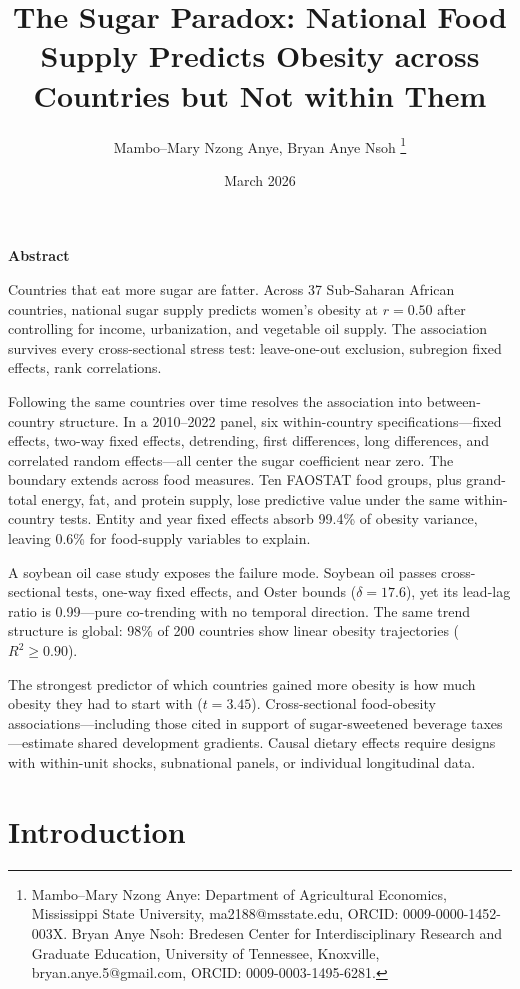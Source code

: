 \documentclass[letterpaper,11pt,leqno]{article}
\title{The Sugar Paradox: National Food Supply Predicts Obesity across Countries but Not within Them}
\author{Mambo–Mary Nzong Anye, Bryan Anye Nsoh
\thanks{Mambo–Mary Nzong Anye: Department of Agricultural Economics, Mississippi State University, ma2188@msstate.edu, ORCID: 0009-0000-1452-003X. Bryan Anye Nsoh: Bredesen Center for Interdisciplinary Research and Graduate Education, University of Tennessee, Knoxville, bryan.anye.5@gmail.com, ORCID: 0009-0003-1495-6281.}}
\date{March 2026}
\begin{document}
\begin{titlepage}
\maketitle

\bigskip
\noindent\textbf{Abstract}
\medskip

\noindent Countries that eat more sugar are fatter.
Across 37 Sub-Saharan African countries, national sugar supply predicts women's obesity at $r = 0.50$ after controlling for income, urbanization, and vegetable oil supply.
The association survives every cross-sectional stress test: leave-one-out exclusion, subregion fixed effects, rank correlations.

Following the same countries over time resolves the association into between-country structure.
In a 2010--2022 panel, six within-country specifications---fixed effects, two-way fixed effects, detrending, first differences, long differences, and correlated random effects---all center the sugar coefficient near zero.
The boundary extends across food measures. Ten FAOSTAT food groups, plus grand-total energy, fat, and protein supply, lose predictive value under the same within-country tests. Entity and year fixed effects absorb 99.4\% of obesity variance, leaving 0.6\% for food-supply variables to explain.

A soybean oil case study exposes the failure mode. Soybean oil passes cross-sectional tests, one-way fixed effects, and Oster bounds ($\delta = 17.6$), yet its lead-lag ratio is 0.99---pure co-trending with no temporal direction. The same trend structure is global: 98\% of 200 countries show linear obesity trajectories ($R^2 \geq 0.90$).

The strongest predictor of which countries gained more obesity is how much obesity they had to start with ($t = 3.45$). Cross-sectional food-obesity associations---including those cited in support of sugar-sweetened beverage taxes---estimate shared development gradients. Causal dietary effects require designs with within-unit shocks, subnational panels, or individual longitudinal data.

\end{titlepage}

\section{Introduction}
\end{document}
